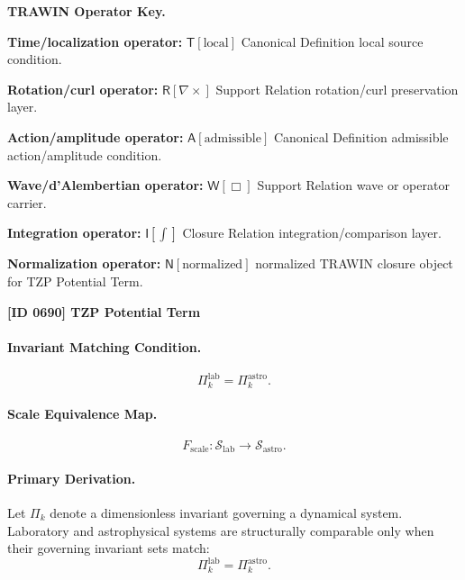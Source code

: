 \par\vspace{0.45\baselineskip}
\noindent\begin{minipage}[t]{\linewidth}
\begingroup
\small
\raggedright
\textbf{TRAWIN Operator Key.}\par
\noindent\textbf{Time/localization operator:} $\mathsf{T}\!\left[\mathrm{local}\right]$ Canonical Definition local source condition.\par
\noindent\textbf{Rotation/curl operator:} $\mathsf{R}\!\left[\nabla\times\right]$ Support Relation rotation/curl preservation layer.\par
\noindent\textbf{Action/amplitude operator:} $\mathsf{A}\!\left[\mathrm{admissible}\right]$ Canonical Definition admissible action/amplitude condition.\par
\noindent\textbf{Wave/d'Alembertian operator:} $\mathsf{W}\!\left[\Box\right]$ Support Relation wave or operator carrier.\par
\noindent\textbf{Integration operator:} $\mathsf{I}\!\left[\int\right]$ Closure Relation integration/comparison layer.\par
\noindent\textbf{Normalization operator:} $\mathsf{N}\!\left[\mathrm{normalized}\right]$ normalized TRAWIN closure object for TZP Potential Term.\par
\endgroup
\end{minipage}

\clearpage
\noindent\textbf{[ID 0690] TZP Potential Term}\par
\vspace{0.35em}
\paragraph{Invariant Matching Condition.}
\begin{equation}
\Pi_k^{\mathrm{lab}}
=
\Pi_k^{\mathrm{astro}} .
\end{equation}

\paragraph{Scale Equivalence Map.}
\begin{equation}
F_{\mathrm{scale}}:
\mathcal{S}_{\mathrm{lab}}
\longrightarrow
\mathcal{S}_{\mathrm{astro}} .
\end{equation}

\paragraph{Primary Derivation.}
Let $\Pi_k$ denote a dimensionless invariant governing a dynamical system.  
Laboratory and astrophysical systems are structurally comparable only when their governing invariant sets match:
\begin{equation}
\Pi_k^{\mathrm{lab}}
=
\Pi_k^{\mathrm{astro}} .
\end{equation}

